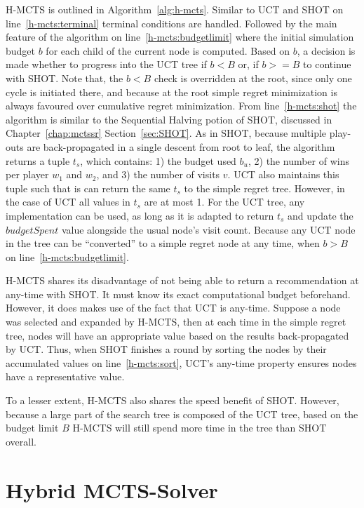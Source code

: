\documentclass{kecsmstr}
\begin{document}
\DecMargin{1em}

H-MCTS is outlined in Algorithm~\ref{alg:h-mcts}. Similar to UCT and SHOT on line~\ref{h-mcts:terminal} terminal conditions are handled. Followed by the main feature of the algorithm on line~\ref{h-mcts:budgetlimit} where the initial simulation budget $b$ for each child of the current node is computed. Based on $b$, a decision is made whether to progress into the UCT tree if $b<B$ or, if $b >= B$ to continue with SHOT. Note that, the $b<B$ check is overridden at the root, since only one cycle is initiated there, and because at the root simple regret minimization is always favoured over cumulative regret minimization. From line~\ref{h-mcts:shot} the algorithm is similar to the Sequential Halving potion of SHOT, discussed in Chapter~\ref{chap:mctssr} Section~\ref{sec:SHOT}. As in SHOT, because multiple play-outs are back-propagated in a single descent from root to leaf, the algorithm returns a tuple $t_s$, which contains: 1) the budget used $b_u$, 2) the number of wins per player $w_1$ and $w_2$, and 3) the number of visits $v$. UCT also maintains this tuple such that is can return the same $t_s$ to the simple regret tree. However, in the case of UCT all values in $t_s$ are at most 1. For the UCT tree, any implementation can be used, as long as it is adapted to return $t_s$ and update the $budgetSpent$ value alongside the usual node's visit count. Because any UCT node in the tree can be ``converted'' to a simple regret node at any time, when $b>B$ on line~\ref{h-mcts:budgetlimit}.

H-MCTS shares its disadvantage of not being able to return a recommendation at any-time with SHOT. It must know its exact computational budget beforehand. However, it does makes use of the fact that UCT is any-time. Suppose a node was selected and expanded by H-MCTS, then at each time in the simple regret tree, nodes will have an appropriate value based on the results back-propagated by UCT. Thus, when SHOT finishes a round by sorting the nodes by their accumulated values on line~\ref{h-mcts:sort}, UCT's any-time property ensures nodes have a representative value.

To a lesser extent, H-MCTS also shares the speed benefit of SHOT. However, because a large part of the search tree is composed of the UCT tree, based on the budget limit $B$ H-MCTS will still spend more time in the tree than SHOT overall.

\section{Hybrid MCTS-Solver}
\label{sec:hybmctssolver}
\end{document}
